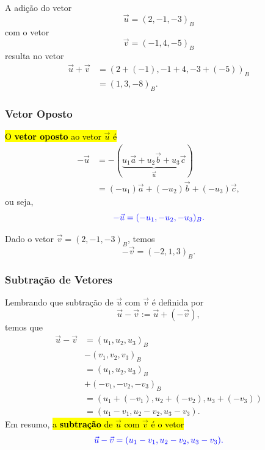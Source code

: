 \begin{ex}
  A adição do vetor 
  \begin{equation}
    \vec{u} = (2, -1, -3)_B
  \end{equation} 
  com o vetor 
  \begin{equation}
    \vec{v} = (-1, 4, -5)_B
  \end{equation} 
  resulta no vetor
  \begin{align}
    \vec{u}+\vec{v} &= \left(2+(-1), -1+4, -3+(-5)\right)_B\\
      &= (1,3,-8)_B.
  \end{align}
\end{ex}

\subsubsection{Vetor Oposto}

\hl{O \textbf{vetor oposto} ao vetor $\vec{u}$ é}
\begin{align}
  -\vec{u} &= -(\underbrace{u_1\vec{a} + u_2\vec{b} + u_3\vec{c}}_{\vec{u}})\\
           &= (-u_1)\vec{a} + (-u_2)\vec{b} + (-u_3)\vec{c},
\end{align}
ou seja,
\begin{equation}\color{blue}-\vec{u} = (-u_1, -u_2, -u_3)_B.
\end{equation}

\begin{ex}
  Dado o vetor $\vec{v} = (2, -1, -3)_B$, temos
  \begin{equation}
    -\vec{v} = \left(-2, 1, 3\right)_B.
  \end{equation}
\end{ex}

\subsubsection{Subtração de Vetores}

Lembrando que subtração de $\vec{u}$ com $\vec{v}$ é definida por
\begin{equation}
    \vec{u}-\vec{v} := \vec{u} + (-\vec{v}),
\end{equation}
temos que
\begin{align}
  \vec{u} - \vec{v} &= (u_1, u_2, u_3)_B\nonumber\\
                    &- (v_1, v_2, v_3)_B\\
                    &= (u_1, u_2, u_3)_B\nonumber\\
                    &+ (-v_1, -v_2, -v_3)_B\\
                    &= \left(u_1+(-v_1), u_2+(-v_2), u_3+(-v_3)\right)\\
                    &= (u_1-v_1, u_2-v_2, u_3-v_3).
\end{align}
Em resumo, \hl{a \textbf{subtração} de $\vec{u}$ com $\vec{v}$ é o vetor}
\begin{equation}\color{blue}\vec{u} - \vec{v} = (u_1-v_1, u_2-v_2, u_3-v_3).
\end{equation}


